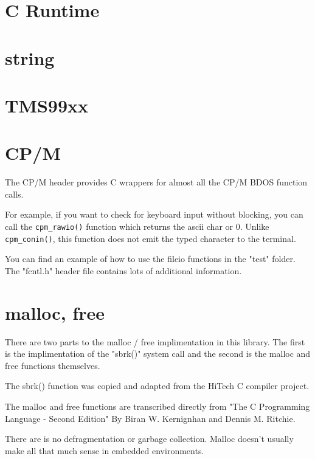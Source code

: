 \documentclass[10pt,a4paper]{article}
\begin{document}
\section{C Runtime}

\break

\section{string}

\pagebreak

\section{TMS99xx}

\pagebreak

\section{CP/M}
The CP/M header provides C wrappers for almost all the CP/M BDOS function calls.

For example, if you want to check for keyboard input without blocking, you can
call the \texttt{cpm\_rawio()} function which returns the ascii char or 0.
Unlike \texttt{cpm\_conin()}, this function does not emit the typed character to
the terminal.

You can find an example of how to use the fileio functions in the "test"
folder.  The "fcntl.h" header file contains lots of additional information.

\pagebreak

\section{malloc, free}
There are two parts to the malloc / free implimentation in this library.  The
first is the implimentation of the "sbrk()" system call and the second is the
malloc and free functions themselves.

The sbrk() function was copied and adapted from the HiTech C compiler project.

The malloc and free functions are transcribed directly from "The C Programming
Language - Second Edition" By Biran W. Kernignhan and Dennis M. Ritchie.

There are is no defragmentation or garbage collection.  Malloc doesn't usually
make all that much sense in embedded environments.


\pagebreak
\end{document}
